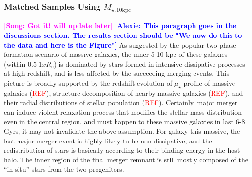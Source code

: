 \documentclass{emulateapj}
\def\minn{{$M_{\star,10\mathrm{kpc}}$}}
\def\mden{{$\mu_{\star}$}}
\newcommand{\addref}{{\textcolor{red}{REF}}}
\newcommand{\song}[1]{\textcolor{magenta}{\textbf{[Song: #1]}}}
\newcommand{\alexie}[1]{\textcolor{blue}{\textbf{[Alexie: #1]}}}
\begin{document}
\begin{CJK*}{UTF8}{gbsn}
\subsubsection{Matched Samples Using \minn{}}
    \label{sssec:sbp_minn}

    \song{Got it! will update later}
    \alexie{This paragraph goes in the discussions section. The results section should be "We now do this to the data and here is the Figure"} As suggested by the popular two-phase formation scenario of massive galaxies, 
    the inner 5-10 kpc of these galaxies (within 0.5-1$xR_{\mathrm{e}}$) is 
    dominated by stars formed in intensive dissipative processes at high redshift, 
    and is less affected by the succeeding merging events.  
    This picture is broadly supported by the redshift evolution of \mden{} profile
    of massive galaxies (\addref), structure decomposition of nearby massive galaxies 
    (\addref), and their radial distributions of stellar population (\addref).      
    Certainly, major merger can induce violent relaxation process that modifies the 
    stellar mass distribution even in the central region, and must happen to 
    these massive galaxies in last 6-8 Gyrs, it may not invalidate the above assumption.
    For galaxy this massive, the last major merger event is highly likely to be
    non-dissipative, and the redistribution of stars is basically according to their 
    binding energy in the host halo.  
    The inner region of the final merger remnant is still mostly composed 
    of the ``in-situ'' stars from the two progenitors.  
        

\end{CJK*}
\end{document}
